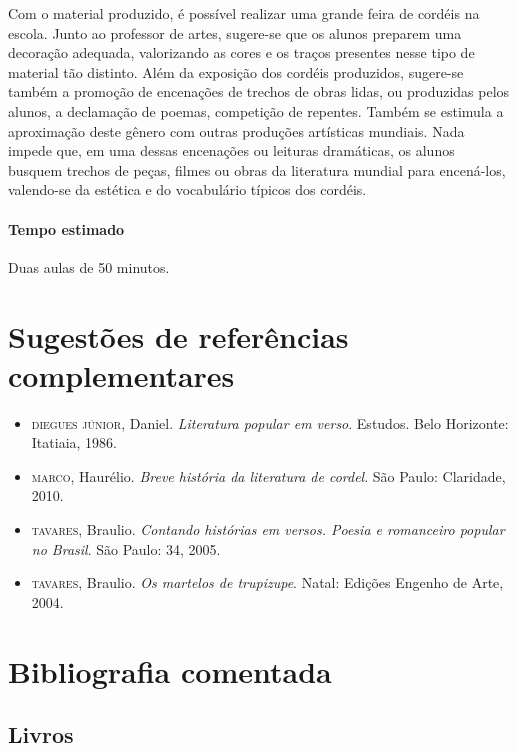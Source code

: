 \documentclass[11pt]{extarticle}
\begin{document}
Com o material produzido, é possível realizar uma grande
feira de cordéis na escola. Junto ao professor de artes, sugere-se que
os alunos preparem uma decoração adequada, valorizando as cores e os
traços presentes nesse tipo de material tão distinto. Além da exposição
dos cordéis produzidos, sugere-se também a promoção de encenações de
trechos de obras lidas, ou produzidas pelos alunos, a declamação de
poemas, competição de repentes. Também se estimula a aproximação deste
gênero com outras produções artísticas mundiais. Nada impede que, em uma
dessas encenações ou leituras dramáticas, os alunos busquem trechos
de peças, filmes ou obras da literatura mundial para encená-los, valendo-se
da estética e do vocabulário típicos dos cordéis.

\paragraph{Tempo estimado} Duas aulas de 50 minutos.

\section{Sugestões de referências complementares}


\begin{itemize}
\item \textsc{diegues júnior}, Daniel. \textit{Literatura popular em verso}. Estudos. Belo Horizonte: Itatiaia, 1986. 

\item \textsc{marco}, Haurélio. \textit{Breve história da literatura de cordel}. São Paulo: Claridade, 2010.

\item \textsc{tavares}, Braulio. \textit{Contando histórias em versos. Poesia e romanceiro popular no Brasil}. São Paulo: 34, 2005.

\item \textsc{tavares}, Braulio. \textit{Os martelos de trupizupe}. Natal: Edições Engenho de Arte, 2004.
\end{itemize}

\section{Bibliografia comentada}

\subsection{Livros}
\end{document}
